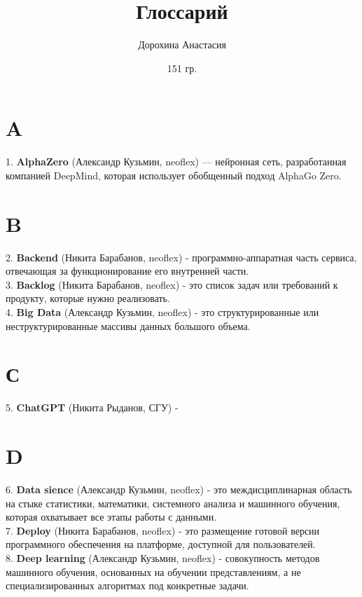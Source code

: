 \documentclass[14 pt]{extarticle}
\title{Глоссарий}
\author{Дорохина Анастасия}
\date{151 гр.}
\begin{document}
\maketitle

\section*{A}
    1. \textbf{AlphaZero} (Александр Кузьмин, neoflex) — нейронная сеть, разработанная компанией DeepMind, которая использует обобщенный подход AlphaGo Zero.
\section*{B}
    2. \textbf{Backend} (Никита Барабанов, neoflex) - программно-аппаратная часть сервиса, отвечающая за функционирование его внутренней части.\\

    3. \textbf{Backlog} (Никита Барабанов, neoflex) - это список задач или требований к продукту, которые нужно реализовать.\\
    
    4. \textbf{Big Data} (Александр Кузьмин, neoflex) - это структурированные или неструктурированные массивы данных большого объема.
    
\section*{С}
    5. \textbf{ChatGPT} (Никита Рыданов, СГУ) - \\
    
\section*{D}
    6. \textbf{Data sience} (Александр Кузьмин, neoflex) - это междисциплинарная область на стыке статистики, математики, системного анализа и машинного обучения, которая охватывает все этапы работы с данными. \\
    
    7. \textbf{Deploy} (Никита Барабанов, neoflex) - это размещение готовой версии программного обеспечения на платформе, доступной для пользователей. \\

    8. \textbf{Deep learning} (Александр Кузьмин, neoflex) - совокупность методов машинного обучения, основанных на обучении представлениям, а не специализированных алгоритмах под конкретные задачи. \\
\end{document}
